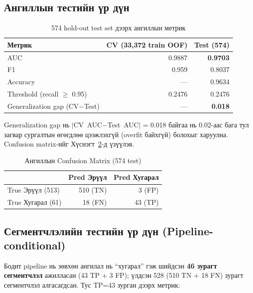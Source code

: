 \subsection*{Ангиллын тестийн үр дүн}

\begin{table}[!htbp]
    \centering
    \begin{tabular}{l r r}
    \toprule
    \textbf{Метрик} & \textbf{CV (33{,}372 train OOF)} & \textbf{Test (574)} \\
    \midrule
    AUC                       & 0.9887 & \textbf{0.9703} \\[4pt]
    F1                        & 0.959  & 0.8037 \\[4pt]
    Accuracy                  & ---    & 0.9634 \\[4pt]
    Threshold (recall $\ge$ 0.95) & 0.2476 & 0.2476 \\[4pt]
    Generalization gap (CV$-$Test) & --- & \textbf{0.018} \\
    \bottomrule
    \end{tabular}
    \caption{574 hold-out test set дээрх ангиллын метрик}
    \label{tab:test_cls}
\end{table}

Generalization gap нь $|$CV~AUC$-$Test~AUC$|$ = 0.018 байгаа нь 0.02-аас бага тул загвар сургалтын өгөгдлөө цээжлэхгүй (overfit байхгүй) болохыг харуулна. Confusion matrix-ийг Хүснэгт~\ref{tab:test_cm}-д үзүүлэв.

\begin{table}[!htbp]
    \centering
    \begin{tabular}{l r r}
    \toprule
     & \textbf{Pred Эрүүл} & \textbf{Pred Хугарал} \\
    \midrule
    True Эрүүл (513) & 510 (TN) & 3 (FP) \\[4pt]
    True Хугарал (61) & 18 (FN)  & 43 (TP) \\
    \bottomrule
    \end{tabular}
    \caption{Ангиллын Confusion Matrix (574 test)}
    \label{tab:test_cm}
\end{table}

\subsection*{Сегментчлэлийн тестийн үр дүн (Pipeline-conditional)}

Бодит pipeline нь зөвхөн ангилал нь ``хугарал'' гэж шийдсэн \textbf{46 зурагт сегментчлэл} ажилласан (43 TP + 3 FP); үлдсэн 528 (510 TN + 18 FN) зурагт сегментчлэл алгасагдсан. Тус TP=43 зурган дээрх метрик:

